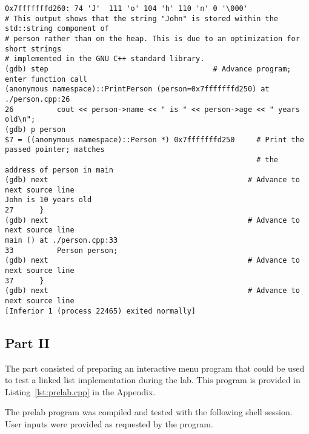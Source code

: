 \documentclass[11pt, letterpaper]{article} %
\begin{document}
\begin{lstlisting}[style=labreportstyle-sh,escapechar=!]
0x7fffffffd260: 74 'J'  111 'o' 104 'h' 110 'n' 0 '\000'
# This output shows that the string "John" is stored within the std::string component of
# person rather than on the heap. This is due to an optimization for short strings
# implemented in the GNU C++ standard library.
(gdb) step                                      # Advance program; enter function call
(anonymous namespace)::PrintPerson (person=0x7fffffffd250) at ./person.cpp:26
26          cout << person->name << " is " << person->age << " years old\n";
(gdb) p person
$7 = ((anonymous namespace)::Person *) 0x7fffffffd250     # Print the passed pointer; matches
                                                          # the address of person in main
(gdb) next                                              # Advance to next source line
John is 10 years old
27      }
(gdb) next                                              # Advance to next source line
main () at ./person.cpp:33
33          Person person;
(gdb) next                                              # Advance to next source line
37      }
(gdb) next                                              # Advance to next source line
[Inferior 1 (process 22465) exited normally]
\end{lstlisting}


\subsection*{Part II}
The part consisted of preparing an interactive menu program that could be used to test a linked list implementation during the lab. This program is provided in Listing~\ref{lst:prelab.cpp} in the Appendix. 

The prelab program was compiled and tested with the following shell session. User inputs were provided as requested by the program.
\end{document}
